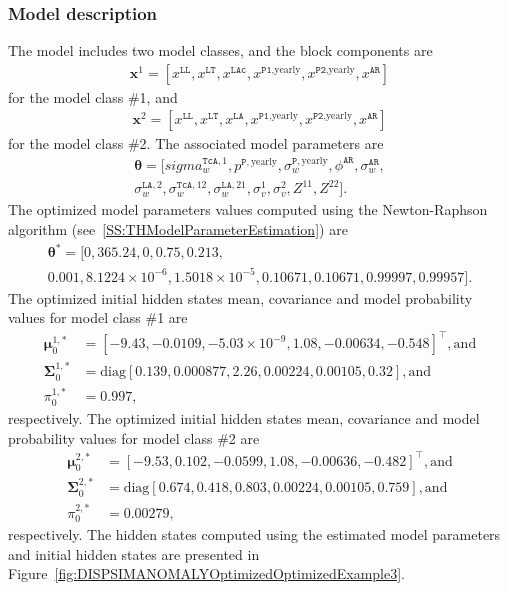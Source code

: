 \subsubsection{Model description}
\label{SS:ModelConstructionExample3}
The model includes two model classes, and the block components are 
\begin{gather*}
\mathbf{x}^{1}=[x^{\mathtt{LL}}, x^{\mathtt{LT}}, x^{\mathtt{LAc}}, x^{\mathtt{P1}\text{,yearly}} , x^{\mathtt{P2}\text{,yearly}}, x^{\mathtt{AR}}]
 \end{gather*}
for the model class \#1, and
\begin{gather*}
\mathbf{x}^{2}=[x^{\mathtt{LL}}, x^{\mathtt{LT}}, x^{\mathtt{LA}}, x^{\mathtt{P1}\text{,yearly}} , x^{\mathtt{P2}\text{,yearly}}, x^{\mathtt{AR}}]
 \end{gather*}
for the model class \#2.
The associated model parameters are
\begin{gather*}
\bm\theta=[sigma_{w}^{\mathtt{TcA},1}, p^{\mathtt{P}, \text{yearly}}, \sigma_{w}^{\mathtt{P}, \text{yearly}}, \phi^{\mathtt{AR}}, \sigma_{w}^{\mathtt{AR}}, \\
 \sigma_{w}^{\mathtt{LA},2}, \sigma_{w}^{\mathtt{TcA}, 12}, \sigma_{w}^{\mathtt{LA}, 21}, \sigma^{1}_{v}, \sigma^{2}_{v}, Z^{11},   Z^{22}] \text{.}
 \end{gather*}
The optimized model parameters values computed using the Newton-Raphson algorithm (see~\ref{SS:THModelParameterEstimation}) are
\begin{gather*}
\bm\theta^{\text{*}}=[0, 365.24, 0, 0.75, 0.213, \\
0.001, 8.1224\times10^{-6}, 1.5018\times10^{-5}, 0.10671, 0.10671, 0.99997, 0.99957].
\end{gather*}
The optimized initial hidden states mean, covariance  and model probability values for model class \#1 are 
\begin{align*}
 \bm \mu^{1,\text{*}}_{0} & = [	-9.43 ,	-0.0109	, -5.03\times 10^{-9}	, 1.08  ,	-0.00634	, -0.548    ]^{\intercal}, \text{and} \\
\bm\Sigma^{1,\text{*}}_{0}  & = \text{diag}[	0.139 ,	0.000877,	2.26  	,0.00224	,0.00105,	0.32     ],  \text{and} \\
 \pi_{0}^{1,\text{*}} & = 0.997,
\end{align*}
respectively.
The optimized initial hidden states mean, covariance  and model probability values for model class \#2 are 
\begin{align*}
 \bm \mu^{2,\text{*}}_{0} & = [	-9.53 ,	0.102 ,	-0.0599	,  1.08  ,	-0.00636, 	-0.482     ]^{\intercal}, \text{and} \\
 \bm\Sigma^{2,\text{*}}_{0}  & = \text{diag}[	0.674 	,0.418 ,	0.803 ,	0.00224,	0.00105	, 0.759    ], \text{and} \\
 \pi_{0}^{2,\text{*}} & = 0.00279,
\end{align*}
respectively.
The hidden states computed using the estimated model parameters and initial hidden states are presented in Figure~\ref{fig:DISPSIMANOMALYOptimizedOptimizedExample3}.

